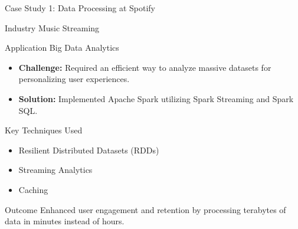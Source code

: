 \documentclass[aspectratio=169]{beamer}
\begin{document}
\begin{frame}{Case Study 1: Data Processing at Spotify}
  \begin{block}{Industry}
    Music Streaming
  \end{block}
  
  \begin{block}{Application}
    Big Data Analytics
  \end{block}

  \begin{itemize}
    \item \textbf{Challenge:} Required an efficient way to analyze massive datasets for personalizing user experiences.
    \item \textbf{Solution:} Implemented Apache Spark utilizing Spark Streaming and Spark SQL.
  \end{itemize}
  
  \begin{block}{Key Techniques Used}
    \begin{itemize}
      \item Resilient Distributed Datasets (RDDs)
      \item Streaming Analytics
      \item Caching
    \end{itemize}
  \end{block}

  \begin{block}{Outcome}
    Enhanced user engagement and retention by processing terabytes of data in minutes instead of hours.
  \end{block}
\end{frame}
\end{document}
